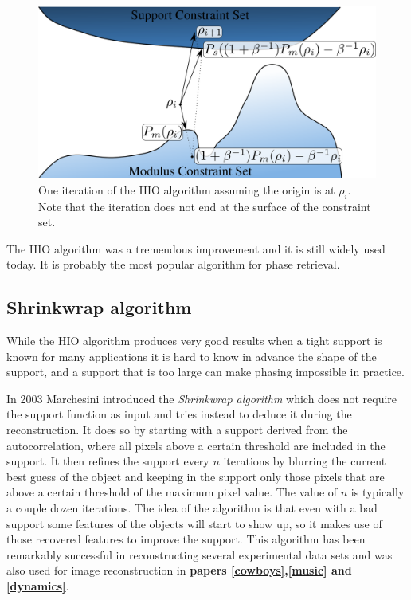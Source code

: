 \begin{figure}[h]
\centering
  \includegraphics[width=0.9 \columnwidth]{Image_Reconstruction/hio_iteration.png}
  \caption{One iteration of the HIO algorithm assuming the origin is at
    $\rho_i$. Note that the iteration does not end at the surface of the
    constraint set.}
  \label{Fig:HIO_Iteration}
\end{figure}

The HIO algorithm was a tremendous improvement and it is still widely used
today. It is probably the most popular algorithm for phase retrieval. 

\subsection{Shrinkwrap algorithm}

While the HIO algorithm produces very good results when a tight support is known
for many applications it is hard to know in advance the shape of the support,
and a support that is too large can make phasing impossible in practice. 

In 2003 Marchesini \cite{Marchesini2003Xray} introduced the {\em Shrinkwrap
  algorithm} which does not require the support function as input and tries instead
to deduce it during the reconstruction. It does so by starting with a
support derived from the autocorrelation, where all pixels above a certain
threshold are included in the support. It then refines the support every $n$
iterations by blurring the current best guess of the object and keeping in the
support only those pixels that are above a certain threshold of the maximum pixel
value. The value of $n$ is typically a couple dozen iterations. The idea of the
algorithm is that even with a bad support some features of the objects will
start to show up, so it makes use of those recovered features to improve the
support. This algorithm has been remarkably successful in reconstructing several
experimental data sets
\cite{Chapman2006Highresolution,Barty2008Ultrafast,Barty2008Threedimensional} and was also used for image reconstruction in {\bf papers
\ref{cowboys},\ref{music} and \ref{dynamics}}.

